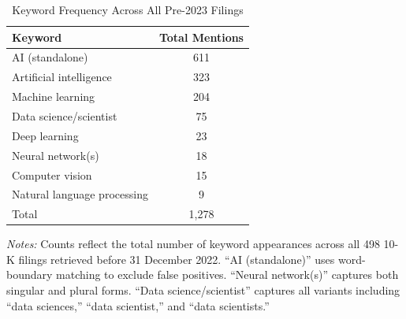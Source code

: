 \begin{table}[H]
\centering
\caption{Keyword Frequency Across All Pre-2023 Filings}
\label{tab:keywords}
\small
\begin{tabular}{lc}
\toprule
Keyword & Total Mentions \\
\midrule
AI (standalone)              & 611 \\
Artificial intelligence      & 323 \\
Machine learning             & 204 \\
Data science/scientist       & 75 \\
Deep learning                & 23 \\
Neural network(s)            & 18 \\
Computer vision              & 15 \\
Natural language processing  & 9 \\
\midrule
Total                        & 1{,}278 \\
\bottomrule
\end{tabular}
\vspace{0.4em}
\begin{minipage}{0.95\linewidth}
\footnotesize
\textit{Notes:} Counts reflect the total number of keyword appearances across all 498 10-K filings retrieved before 31 December 2022. ``AI (standalone)'' uses word-boundary matching to exclude false positives. ``Neural network(s)'' captures both singular and plural forms. ``Data science/scientist'' captures all variants including ``data sciences,'' ``data scientist,'' and ``data scientists.''
\end{minipage}
\end{table}